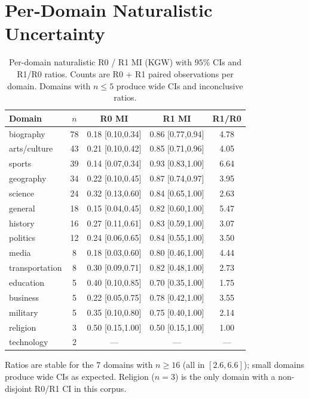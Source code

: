 \documentclass[11pt]{article}
\begin{document}
\section{Per-Domain Naturalistic Uncertainty}
\label{app:per_domain_uncertainty}
\begin{table}[h]
\centering\small
\caption{Per-domain naturalistic R0 / R1 MI (KGW) with $95\%$ CIs and
R1/R0 ratios. Counts are R0 + R1 paired observations per domain.
Domains with $n\leq 5$ produce wide CIs and inconclusive ratios.}
\label{tab:per_domain_uncertainty}
\begin{tabular}{l c c c c}
\toprule
Domain & $n$ & R0 MI & R1 MI & R1/R0 \\
\midrule
biography & 78 & 0.18 [0.10,0.34] & 0.86 [0.77,0.94] & 4.78 \\
arts/culture & 43 & 0.21 [0.10,0.42] & 0.85 [0.71,0.96] & 4.05 \\
sports & 39 & 0.14 [0.07,0.34] & 0.93 [0.83,1.00] & 6.64 \\
geography & 34 & 0.22 [0.10,0.45] & 0.87 [0.74,0.97] & 3.95 \\
science & 24 & 0.32 [0.13,0.60] & 0.84 [0.65,1.00] & 2.63 \\
general & 18 & 0.15 [0.04,0.45] & 0.82 [0.60,1.00] & 5.47 \\
history & 16 & 0.27 [0.11,0.61] & 0.83 [0.59,1.00] & 3.07 \\
politics & 12 & 0.24 [0.06,0.65] & 0.84 [0.55,1.00] & 3.50 \\
media & 8 & 0.18 [0.03,0.60] & 0.80 [0.46,1.00] & 4.44 \\
transportation & 8 & 0.30 [0.09,0.71] & 0.82 [0.48,1.00] & 2.73 \\
education & 5 & 0.40 [0.10,0.85] & 0.70 [0.35,1.00] & 1.75 \\
business & 5 & 0.22 [0.05,0.75] & 0.78 [0.42,1.00] & 3.55 \\
military & 5 & 0.35 [0.10,0.80] & 0.75 [0.40,1.00] & 2.14 \\
religion & 3 & 0.50 [0.15,1.00] & 0.50 [0.15,1.00] & 1.00 \\
technology & 2 & --- & --- & --- \\
\bottomrule
\end{tabular}
\end{table}
Ratios are stable for the $7$ domains with $n\geq 16$ (all in $[2.6, 6.6]$);
small domains produce wide CIs as expected. Religion ($n{=}3$) is the only
domain with a non-disjoint R0/R1 CI in this corpus.
\end{document}
